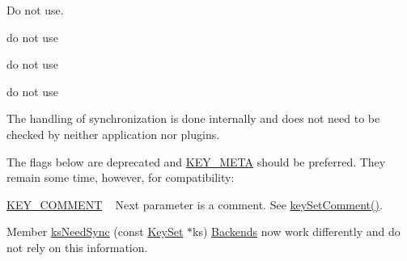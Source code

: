 
\begin{DoxyRefList}
\item[\label{deprecated__deprecated000005}%
\Hypertarget{deprecated__deprecated000005}%
Member \hyperlink{group__invoke_gaae89e2497eba478be2043f1b25adbb3c}{elektra\+Invoke\+Initialize} (const char $\ast$elektra\+Plugin\+Name)]Do not use. 
\item[\label{deprecated__deprecated000007}%
\Hypertarget{deprecated__deprecated000007}%
Member \hyperlink{classkdb_1_1tools_1_1Modules_a6ae72cc8e30fe3fb0aabd6f78fad8ddf}{kdb\+:\+:tools\+:\+:Modules\+:\+:load} (std\+::string const \&plugin\+Name, \hyperlink{classkdb_1_1KeySet}{kdb\+::\+Key\+Set} const \&config)]do not use  
\item[\label{deprecated__deprecated000006}%
\Hypertarget{deprecated__deprecated000006}%
Member \hyperlink{classkdb_1_1tools_1_1Modules_ae8d8c91745c9f517e6e8a556f1664f69}{kdb\+:\+:tools\+:\+:Modules\+:\+:load} (std\+::string const \&plugin\+Name)]do not use  
\item[\label{deprecated__deprecated000001}%
\Hypertarget{deprecated__deprecated000001}%
Member \hyperlink{group__key_gga9b703ca49f48b482def322b77d3e6bc8ab089c5e7977d6e58737eb586ee153b7f}{K\+E\+Y\+\_\+\+N\+U\+LL} ]do not use  
\item[\label{deprecated__deprecated000004}%
\Hypertarget{deprecated__deprecated000004}%
Member \hyperlink{group__keytest_gaf247df0de7aca04b32ef80e39ef12950}{key\+Need\+Sync} (const \hyperlink{classkdb_1_1Key}{Key} $\ast$key)]The handling of synchronization is done internally and does not need to be checked by neither application nor plugins. 
\item[\label{deprecated__deprecated000002}%
\Hypertarget{deprecated__deprecated000002}%
Member \hyperlink{group__key_gad23c65b44bf48d773759e1f9a4d43b89}{key\+New} (const char $\ast$name,...)]The flags below are deprecated and \hyperlink{group__key_gga9b703ca49f48b482def322b77d3e6bc8a040582834bb2d90049947d7ef74e87e2}{K\+E\+Y\+\_\+\+M\+E\+TA} should be preferred. They remain some time, however, for compatibility\+: 
\begin{DoxyCodeInclude}
\end{DoxyCodeInclude}

\begin{DoxyItemize}
\item \hyperlink{group__key_gga9b703ca49f48b482def322b77d3e6bc8ac29427bb47cc31689d02912e36161ee3}{K\+E\+Y\+\_\+\+C\+O\+M\+M\+E\+NT} ~\newline
 Next parameter is a comment. See \hyperlink{group__meta_ga8863a877a84fa46e6017fe72e49b89c1}{key\+Set\+Comment()}. 
\begin{DoxyCodeInclude}
\end{DoxyCodeInclude}
Member \hyperlink{group__keyset_ga8f210432e664d8ba06d7d55a2aba2d0f}{ks\+Need\+Sync} (const \hyperlink{classkdb_1_1KeySet}{Key\+Set} $\ast$ks) \hyperlink{classkdb_1_1tools_1_1Backends}{Backends} now work differently and do not rely on this information.
\end{DoxyItemize}
\end{DoxyRefList}